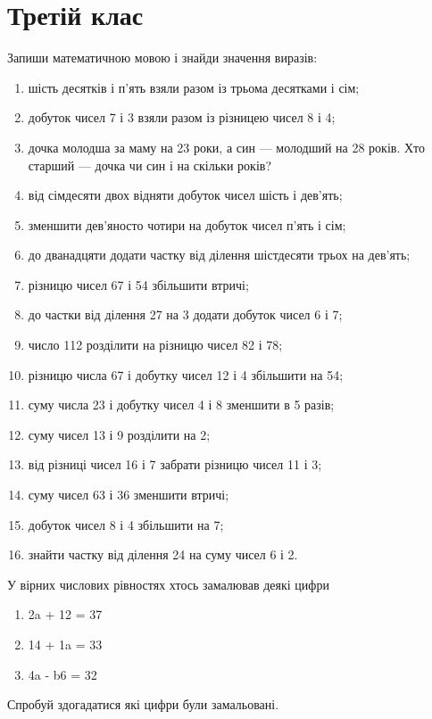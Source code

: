 \chapter{Третій клас}

\problem
Запиши математичною мовою і знайди значення виразів:
\begin{enumerate}
    \item шість десятків і п'ять взяли разом із трьома десятками і сім;
    \item добуток чисел 7 і 3 взяли разом із різницею чисел 8 і 4;
    \item дочка молодша за маму на 23 роки, а син --- молодший на 28 років.
    Хто старший --- дочка чи син і на скільки років?
    \item від сімдесяти двох відняти добуток чисел шість і дев'ять;
    \item зменшити дев'яносто чотири на добуток чисел п'ять і сім;
    \item до дванадцяти додати частку від ділення шістдесяти трьох на дев'ять;
    \item різницю чисел 67 і 54 збільшити втричі;
    \item до частки від ділення 27 на 3 додати добуток чисел 6 і 7;
    \item число 112 розділити на різницю чисел 82 і 78;
    \item різницю числа 67 і добутку чисел 12 і 4 збільшити на 54;
    \item суму числа 23 і добутку чисел 4 і 8 зменшити в 5 разів;
    \item суму чисел 13 і 9 розділити на 2;
    \item від різниці чисел 16 і 7 забрати різницю чисел 11 і 3;
    \item суму чисел 63 і 36 зменшити втричі;
    \item добуток чисел 8 і 4 збільшити на 7;
    \item знайти частку від ділення 24 на суму чисел 6 і 2.
\end{enumerate}


\problem
У вірних числових рівностях хтось замалював деякі цифри
\begin{multicols}{2}
    \begin{enumerate}
        \item 2a + 12 = 37
        \item 14 + 1a = 33
        \item 4a - b6 = 32
    \end{enumerate}
\end{multicols}
Спробуй здогадатися які цифри були замальовані.



